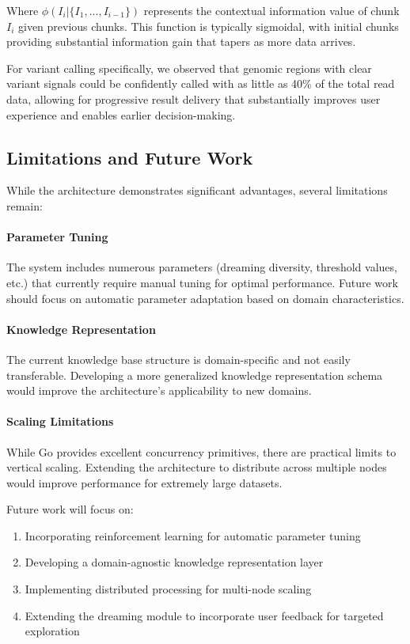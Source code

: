 \documentclass[11pt,a4paper,twocolumn]{article}
\begin{document}
Where $\phi(I_i|\{I_1,...,I_{i-1}\})$ represents the contextual information value of chunk $I_i$ given previous chunks. This function is typically sigmoidal, with initial chunks providing substantial information gain that tapers as more data arrives.

For variant calling specifically, we observed that genomic regions with clear variant signals could be confidently called with as little as 40\% of the total read data, allowing for progressive result delivery that substantially improves user experience and enables earlier decision-making.

\subsection{Limitations and Future Work}

While the architecture demonstrates significant advantages, several limitations remain:

\paragraph{Parameter Tuning} The system includes numerous parameters (dreaming diversity, threshold values, etc.) that currently require manual tuning for optimal performance. Future work should focus on automatic parameter adaptation based on domain characteristics.

\paragraph{Knowledge Representation} The current knowledge base structure is domain-specific and not easily transferable. Developing a more generalized knowledge representation schema would improve the architecture's applicability to new domains.

\paragraph{Scaling Limitations} While Go provides excellent concurrency primitives, there are practical limits to vertical scaling. Extending the architecture to distribute across multiple nodes would improve performance for extremely large datasets.

Future work will focus on:

\begin{enumerate}
    \item Incorporating reinforcement learning for automatic parameter tuning
    \item Developing a domain-agnostic knowledge representation layer
    \item Implementing distributed processing for multi-node scaling
    \item Extending the dreaming module to incorporate user feedback for targeted exploration
\end{enumerate}
\end{document}
